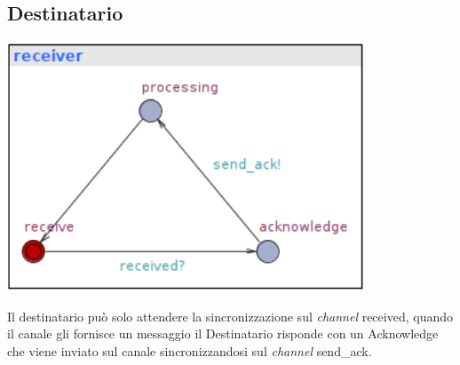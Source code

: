 \documentclass[a4paper]{article}
\newcommand{\channel}{\textit{channel }}
\begin{document}
\subsection{Destinatario}
\begin{center}\includegraphics[width=0.8\textwidth]{1_receiver.png}\end{center}
Il destinatario può solo attendere la sincronizzazione sul \channel received, quando il canale gli fornisce un messaggio il Destinatario risponde con un Acknowledge che viene inviato sul canale sincronizzandosi sul \channel send\_ack.
\end{document}
